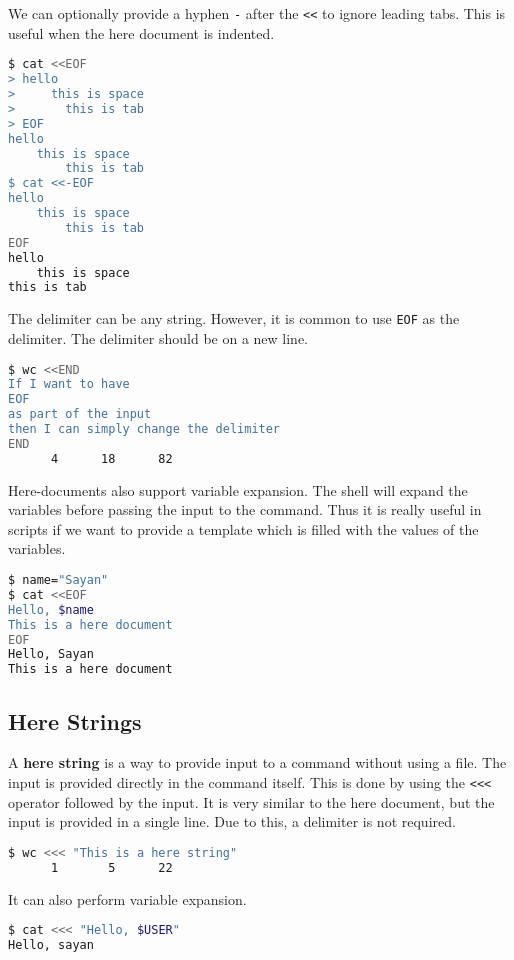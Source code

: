 We can optionally provide a hyphen \texttt{-} after the \texttt{<<}
to ignore leading tabs. This is useful when the here document is
indented.

\begin{lstlisting}[language=bash]
$ cat <<EOF
> hello
>     this is space
>       this is tab
> EOF
hello
    this is space
        this is tab
$ cat <<-EOF
hello
    this is space
        this is tab
EOF
hello
    this is space
this is tab
\end{lstlisting}

The delimiter can be any string. However, it is common to use \texttt{EOF}
as the delimiter. The delimiter should be on a new line.

\begin{lstlisting}[language=bash]
$ wc <<END
If I want to have
EOF
as part of the input
then I can simply change the delimiter
END
      4      18      82
\end{lstlisting}

Here-documents also support variable expansion. The shell will expand
the variables before passing the input to the command. Thus
it is really useful in scripts if we want to provide a template
which is filled with the values of the variables.

\begin{lstlisting}[language=bash]
$ name="Sayan"
$ cat <<EOF
Hello, $name
This is a here document
EOF
Hello, Sayan
This is a here document
\end{lstlisting}

\subsection{Here Strings}

A \textbf{here string} is a way to provide input to a command without
using a file. The input is provided directly in the command itself.
This is done by using the \texttt{<<<} operator followed by the input.
It is very similar to the here document, but the input is provided
in a single line. Due to this, a delimiter is not required.

\begin{lstlisting}[language=bash]
$ wc <<< "This is a here string"
      1       5      22
\end{lstlisting}

It can also perform variable expansion.

\begin{lstlisting}[language=bash]
$ cat <<< "Hello, $USER"
Hello, sayan
\end{lstlisting}

